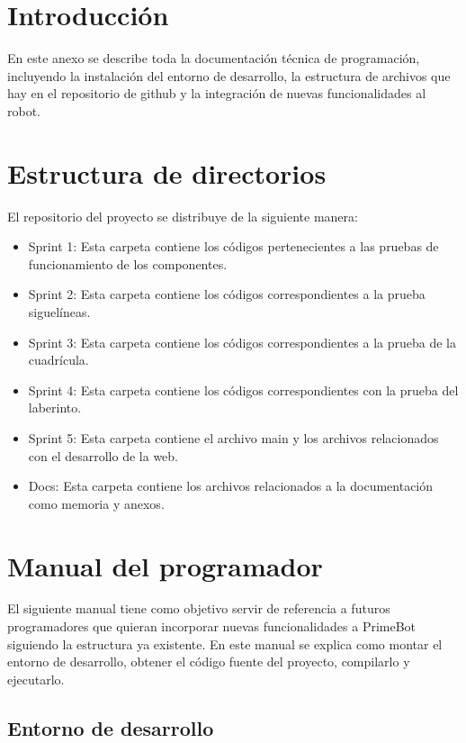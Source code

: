 
\section{Introducción}
En este anexo se describe toda la documentación técnica de programación, incluyendo la instalación del entorno de desarrollo, la estructura de archivos que hay en el repositorio de github y la integración de nuevas funcionalidades al robot.

\section{Estructura de directorios}
El repositorio del proyecto se distribuye de la siguiente manera:

\begin{itemize}
\tightlist
\item
Sprint 1: Esta carpeta contiene los códigos pertenecientes a las pruebas de funcionamiento de los componentes.
\item
Sprint 2: Esta carpeta contiene los códigos correspondientes a la prueba siguelíneas.
\item
Sprint 3: Esta carpeta contiene los códigos correspondientes a la prueba de la cuadrícula.
\item
Sprint 4: Esta carpeta contiene los códigos correspondientes con la prueba del laberinto.
\item
Sprint 5: Esta carpeta contiene el archivo main y los archivos relacionados con el desarrollo de la web.
\item
Docs: Esta carpeta contiene los archivos relacionados a la documentación como memoria y anexos.

\end{itemize}
\section{Manual del programador}

El siguiente manual tiene como objetivo servir de referencia a futuros programadores que quieran incorporar nuevas funcionalidades a PrimeBot siguiendo la estructura ya existente.
En este manual se explica como montar el entorno de desarrollo, obtener el código fuente del proyecto, compilarlo y ejecutarlo.

\subsection{Entorno de desarrollo}\label{entorno-de-desarrollo}

